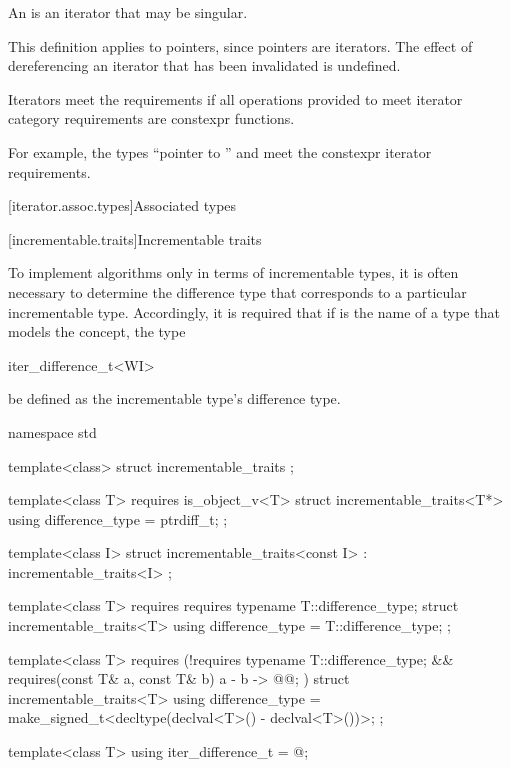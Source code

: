 \pnum
An 
is an iterator that may be singular.
\begin{footnote}
This definition applies to pointers, since pointers are iterators.
The effect of dereferencing an iterator that has been invalidated
is undefined.
\end{footnote}

\pnum
{}%
Iterators meet the  requirements
if all operations provided to meet iterator category requirements
are constexpr functions.
\begin{note}
For example, the types ``pointer to '' and
 meet the constexpr iterator requirements.
\end{note}

[iterator.assoc.types]{Associated types}

[incrementable.traits]{Incrementable traits}

\pnum
To implement algorithms only in terms of incrementable types,
it is often necessary to determine the difference type that
corresponds to a particular incrementable type. Accordingly,
it is required that if  is the name of a type that models the
 concept,
the type
\begin{codeblock}
iter_difference_t<WI>
\end{codeblock}
be defined as the incrementable type's difference type.

%
\begin{codeblock}
namespace std {
  template<class> struct incrementable_traits { };

  template<class T>
    requires is_object_v<T>
  struct incrementable_traits<T*> {
    using difference_type = ptrdiff_t;
  };

  template<class I>
  struct incrementable_traits<const I>
    : incrementable_traits<I> { };

  template<class T>
    requires requires { typename T::difference_type; }
  struct incrementable_traits<T> {
    using difference_type = T::difference_type;
  };

  template<class T>
    requires (!requires { typename T::difference_type; } &&
              requires(const T& a, const T& b) { { a - b } -> @@; })
  struct incrementable_traits<T> {
    using difference_type = make_signed_t<decltype(declval<T>() - declval<T>())>;
  };

  template<class T>
    using iter_difference_t = @\seebelow@;
}
\end{codeblock}

